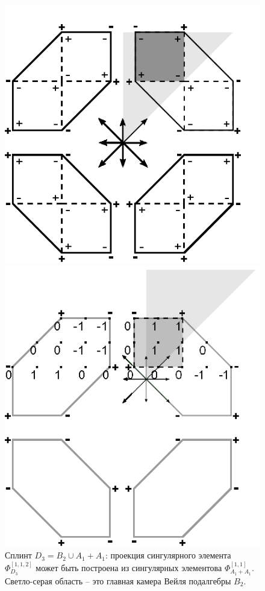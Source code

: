 \documentclass[12pt]{article}
\begin{document}
\begin{figure}[h]
\begin{center}
\begin{minipage}[h]{0.5\linewidth}
\includegraphics[width=0.95\linewidth]{drawing-1}
\caption{Сплинт $D_3= B_2\cup A_1+A_1$: проекция сингулярного элемента  $\Phi_{D_3}^{[1,1,2]}$ может
  быть построена из сингулярных элементова $\Phi_{A_1+A_1}^{[1,1]}$. Светло-серая область -- это
  главная камера Вейля подалгебры $B_2$.} 
\label{ris1} 
\end{minipage}
\hfill
\begin{minipage}[h]{0.47\linewidth}
\includegraphics[width=0.9\linewidth,viewport=0 0 157 157,clip]{drawing-3}

\end{minipage}
\end{center}
\end{figure}
\end{document}
